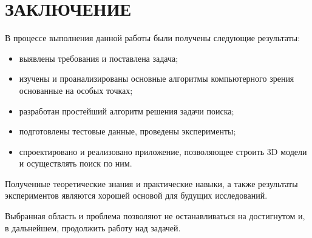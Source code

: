 \chapter*{ЗАКЛЮЧЕНИЕ}    

В процессе выполнения данной работы были получены следующие результаты:

\begin{itemize}
    \item выявлены требования и поставлена задача;
    \item изучены и проанализированы основные алгоритмы компьютерного зрения основанные на особых точках;
    \item разработан простейший алгоритм решения задачи поиска;
    \item подготовлены тестовые данные, проведены эксперименты;
    \item спроектировано и реализовано приложение, позволяющее строить 3D модели и осуществлять поиск по ним.
\end{itemize}

Полученные теоретические знания и практические навыки, а также результаты экспериментов являются хорошей основой для будущих исследований. 

Выбранная область и проблема позволяют не останавливаться на достигнутом и, в дальнейшем, продолжить работу над задачей.
\newpage